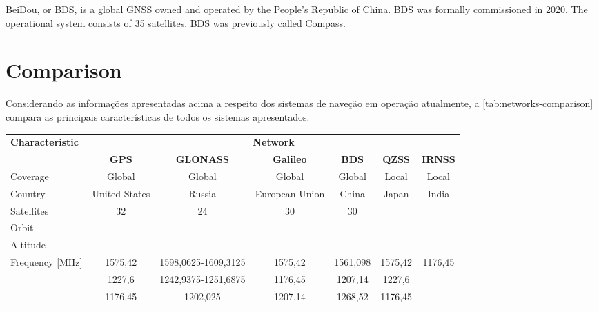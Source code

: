 BeiDou, or BDS, is a global GNSS owned and operated by the People's Republic of China. BDS was formally commissioned in 2020. The operational system consists of 35 satellites. BDS was previously called Compass.

\section{Comparison}

Considerando as informações apresentadas acima a respeito dos sistemas de naveção em operação atualmente, a \autoref{tab:networks-comparison} compara as principais características de todos os sistemas apresentados.

\begin{table}[!h]
    \centering
    \begin{tabular}{lcccccc}
        \toprule[1.5pt]
        \multirow{2}{*}{\textbf{Characteristic}} & \multicolumn{6}{c}{\textbf{Network}} \\
                                                 & \textbf{GPS} & \textbf{GLONASS} & \textbf{Galileo} & \textbf{BDS} & \textbf{QZSS} & \textbf{IRNSS} \\
        \midrule
        Coverage                         & Global            & Global                       & Global               & Global         & Local   & Local \\
        Country                          & United States     & Russia                       & European Union       & China          & Japan   & India \\
        Satellites                       & 32                & 24                           & 30                   & 30             &         &  \\
        Orbit                            &                   &                              &                      &                &         &  \\
        Altitude                         &                   &                              &                      &                &         &  \\
        \multirow{6}{*}{Frequency [MHz]} & 1575,42           & 1598,0625-1609,3125          & 1575,42              & 1561,098       & 1575,42 & 1176,45 \\
                                         & 1227,6            & 1242,9375-1251,6875          & 1176,45              & 1207,14        & 1227,6  &  \\
                                         & 1176,45           & 1202,025                     & 1207,14              & 1268,52        & 1176,45 &  \\

\end{tabular}
\end{table}
